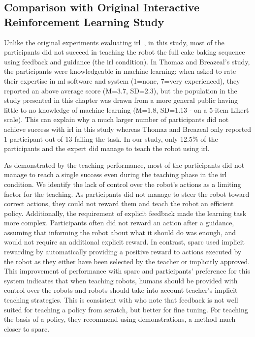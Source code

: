 \subsection{Comparison with Original Interactive Reinforcement Learning Study}

Unlike the original experiments evaluating \gls{irl}~\citep{thomaz2008teachable}, in this study, most of the participants did not succeed in teaching the robot the full cake baking sequence using feedback and guidance (the \gls{irl} condition). In Thomaz and Breazeal's study, the participants were knowledgeable in machine learning: when asked to rate their expertise in \gls{ml} software and system (1=none, 7=very experienced), they reported an above average score (M=3.7, SD=2.3), but the population in the study presented in this chapter was drawn from a more general public having little to no knowledge of machine learning (M=1.8, SD=1.13 - on a 5-item Likert scale). This can explain why a much larger number of participants did not achieve success with \gls{irl} in this study whereas Thomaz and Breazeal only reported 1 participant out of 13 failing the task. In our study, only 12.5\% of the participants and the expert did manage to teach the robot using \gls{irl}. 

As demonstrated by the teaching performance, most of the participants did not manage to reach a single success even during the teaching phase in the \gls{irl} condition. We identify the lack of control over the robot's actions as a limiting factor for the teaching. As participants did not manage to steer the robot toward correct actions, they could not reward them and teach the robot an efficient policy. Additionally, the requirement of explicit feedback made the learning task more complex. Participants often did not reward an action after a guidance, assuming that informing the robot about what it should do was enough, and would not require an additional explicit reward. In contrast, \gls{sparc} used implicit rewarding by automatically providing a positive reward to actions executed by the robot as they either have been selected by the teacher or implicitly approved. This improvement of performance with \gls{sparc} and participants' preference for this system indicates that when teaching robots, humans should be provided with control over the robots and robots should take into account teacher's implicit teaching strategies. This is consistent with \cite{kaochar2011towards} who note that feedback is not well suited for teaching a policy from scratch, but better for fine tuning. For teaching the basis of a policy, they recommend using demonstrations, a method much closer to \gls{sparc}. 

